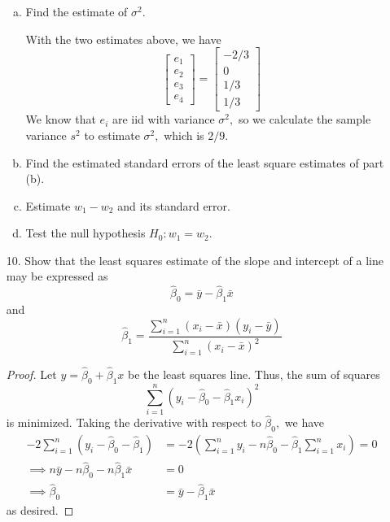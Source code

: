 \documentclass{article}
\begin{document}
\begin{itemize}
\begin{enumerate}[a.]
			\item Find the estimate of $\sigma^2.$
				\begin{soln}
					With the two estimates above, we have
					\[\begin{bmatrix}
							e_1 \\ e_2 \\ e_3 \\ e_4
						\end{bmatrix} = \begin{bmatrix}
							-2/3 \\ 0 \\ 1/3 \\ 1/3
					\end{bmatrix}\]
					We know that $e_i$ are iid with variance $\sigma^2,$ so we calculate the sample variance $s^2$ to estimate $\sigma^2,$ which is $2/9.$
				\end{soln}

			\item Find the estimated standard errors of the least square estimates of part (b).

			\item Estimate $w_1-w_2$ and its standard error.

			\item Test the null hypothesis $H_0: w_1=w_2.$
				
		\end{enumerate}

	\item[10.] Show that the least squares estimate of the slope and intercept of a line may be expressed as \[\hat\beta_0=\bar y-\hat\beta_1\bar x\] and \[\hat\beta_1=\frac{\displaystyle \sum_{i=1}^{n} (x_i-\bar x)(y_i-\bar y)}{\displaystyle \sum_{i=1}^{n} (x_i-\bar x)^2}\]
		\begin{proof}
			Let $y=\hat\beta_0 + \hat\beta_1x$ be the least squares line. Thus, the sum of squares
			\[\sum_{i=1}^{n}(y_i - \hat\beta_0-\hat\beta_1x_i)^2\]
			is minimized. Taking the derivative with respect to $\hat\beta_0,$ we have 
			\begin{align*}
				-2\sum_{i=1}^{n} (y_i-\hat\beta_0-\hat\beta_1) &= -2\left( \sum_{i=1}^{n} y_i -n\hat\beta_0 - \hat\beta_1\sum_{i=1}^{n} x_i \right) = 0 \\
				\implies n\bar y - n\hat\beta_0 - n\hat\beta_1 \bar x &= 0 \\
				\implies \hat\beta_0 &= \bar y - \hat\beta_1\bar x
			\end{align*}
			as desired.


\end{proof}
\end{itemize}
\end{document}
